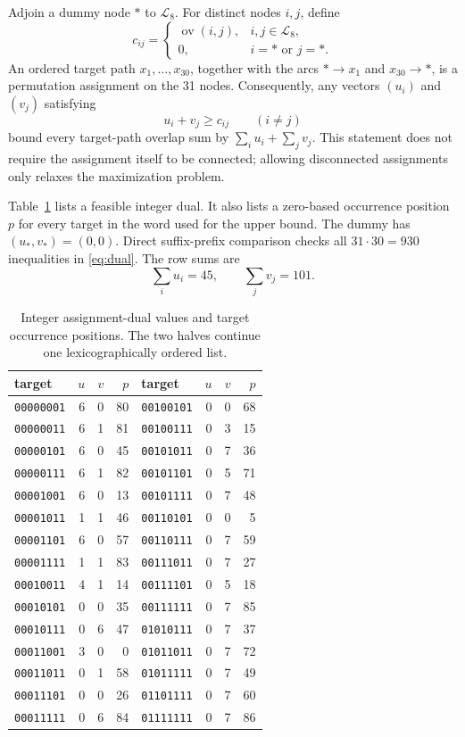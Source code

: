\documentclass[11pt]{amsart}
\theoremstyle{definition}
\newcommand{\Lyn}{\mathcal{L}}
\newcommand{\ov}{\operatorname{ov}}
\begin{document}
Adjoin a dummy node $*$ to $\Lyn_8$.  For distinct nodes $i,j$, define
\[
 c_{ij}=\begin{cases}
 \ov(i,j),&i,j\in\Lyn_8,\\
 0,&i= *\text{ or }j= *.
 \end{cases}
\]
An ordered target path $x_1,\ldots,x_{30}$, together with the arcs
$*\to x_1$ and $x_{30}\to *$, is a permutation assignment on the 31 nodes.
Consequently, any vectors $(u_i)$ and $(v_j)$ satisfying
\begin{equation}\label{eq:dual}
 u_i+v_j\ge c_{ij}\qquad(i\ne j)
\end{equation}
bound every target-path overlap sum by $\sum_i u_i+\sum_jv_j$.  This statement
does not require the assignment itself to be connected; allowing disconnected
assignments only relaxes the maximization problem.

Table~\ref{tab:certificate} lists a feasible integer dual.  It also lists a
zero-based occurrence position $p$ for every target in the word used for the
upper bound.  The dummy has $(u_*,v_*)=(0,0)$.  Direct suffix-prefix comparison
checks all $31\cdot30=930$ inequalities in \eqref{eq:dual}.  The row sums are
\[
 \sum_i u_i=45,\qquad \sum_jv_j=101.
\]

\begin{table}[ht]
\centering
\caption{Integer assignment-dual values and target occurrence positions.
The two halves continue one lexicographically ordered list.}
\label{tab:certificate}
\scriptsize
\setlength{\tabcolsep}{3.4pt}
\begin{tabular}{@{}lrrr@{\qquad}lrrr@{}}
\toprule
target & $u$ & $v$ & $p$ & target & $u$ & $v$ & $p$\\
\midrule
\texttt{00000001}&6&0&80 & \texttt{00100101}&0&0&68 \\
\texttt{00000011}&6&1&81 & \texttt{00100111}&0&3&15 \\
\texttt{00000101}&6&0&45 & \texttt{00101011}&0&7&36 \\
\texttt{00000111}&6&1&82 & \texttt{00101101}&0&5&71 \\
\texttt{00001001}&6&0&13 & \texttt{00101111}&0&7&48 \\
\texttt{00001011}&1&1&46 & \texttt{00110101}&0&0&5 \\
\texttt{00001101}&6&0&57 & \texttt{00110111}&0&7&59 \\
\texttt{00001111}&1&1&83 & \texttt{00111011}&0&7&27 \\
\texttt{00010011}&4&1&14 & \texttt{00111101}&0&5&18 \\
\texttt{00010101}&0&0&35 & \texttt{00111111}&0&7&85 \\
\texttt{00010111}&0&6&47 & \texttt{01010111}&0&7&37 \\
\texttt{00011001}&3&0&0 & \texttt{01011011}&0&7&72 \\
\texttt{00011011}&0&1&58 & \texttt{01011111}&0&7&49 \\
\texttt{00011101}&0&0&26 & \texttt{01101111}&0&7&60 \\
\texttt{00011111}&0&6&84 & \texttt{01111111}&0&7&86 \\
\bottomrule
\end{tabular}
\end{table}
\end{document}
